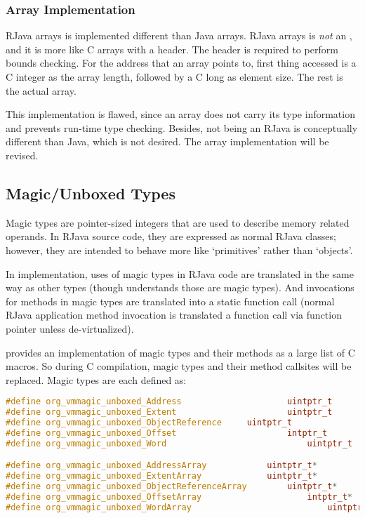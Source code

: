 \documentclass[12pt]{article}
\begin{document}
\subsubsection{Array Implementation}

RJava arrays is implemented different than Java arrays. 
RJava arrays is \emph{not} an , and it is more like
C arrays with a header. The header is required to perform
bounds checking. For the address that an array points to, 
first thing accessed is a C integer as the array length, followed
by a C long as element size. The rest is the actual array. 

This implementation is flawed, since an array does not 
carry its type information and prevents run-time type 
checking. Besides, not being an RJava  is
conceptually different than Java, which is not desired. 
The array implementation will be revised. 

\subsection{Magic/Unboxed Types}

Magic types are pointer-sized integers that are used to describe
memory related operands. In RJava source code, they are expressed
as normal RJava classes; however, they are intended to 
behave more like `primitives' rather than `objects'. 

In \rjc implementation, uses of magic types in RJava code are 
translated in the same way as other types (though \rjc understands
those are magic types). And invocations for methods in magic types
are translated into a static function call (normal 
RJava application method invocation is translated a function call via
function pointer unless de-virtualized). 

\rjc provides an implementation of magic types and their methods
as a large list of C macros. So during C compilation, magic types
and their method callsites will be replaced. Magic types are each defined as:

\begin{lstlisting}[language=c]
#define org_vmmagic_unboxed_Address						uintptr_t
#define org_vmmagic_unboxed_Extent						uintptr_t
#define org_vmmagic_unboxed_ObjectReference		uintptr_t
#define org_vmmagic_unboxed_Offset						intptr_t
#define org_vmmagic_unboxed_Word							uintptr_t

#define org_vmmagic_unboxed_AddressArray			uintptr_t*
#define org_vmmagic_unboxed_ExtentArray				uintptr_t*
#define org_vmmagic_unboxed_ObjectReferenceArray		uintptr_t*
#define org_vmmagic_unboxed_OffsetArray						intptr_t*
#define org_vmmagic_unboxed_WordArray							uintptr_t*
\end{lstlisting}
\end{document}
